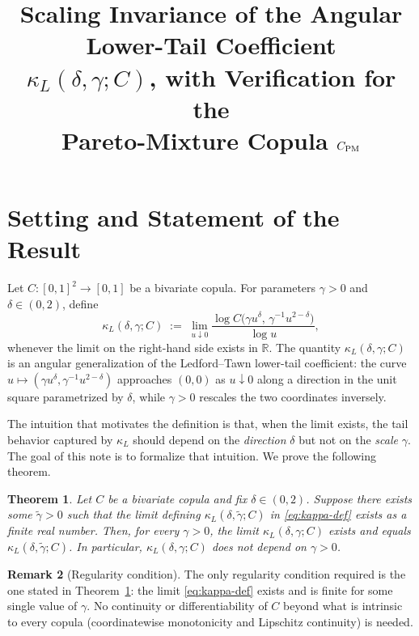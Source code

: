 \documentclass[11pt]{article}
\title{Scaling Invariance of the Angular Lower-Tail Coefficient \\
$\kappa_L(\delta,\gamma;C)$, with Verification for the \\
Pareto-Mixture Copula $C_{\mathrm{PM}}$}
\author{}
\date{}
\newtheorem{theorem}{Theorem}
\theoremstyle{definition}
\newtheorem{remark}[theorem]{Remark}
\newcommand{\R}{\mathbb{R}}
\begin{document}
\maketitle

\section{Setting and Statement of the Result}

Let $C:[0,1]^2\to[0,1]$ be a bivariate copula. For parameters
$\gamma>0$ and $\delta\in(0,2)$, define
\begin{equation}\label{eq:kappa-def}
\kappa_L(\delta,\gamma;C)
\;:=\;
\lim_{u\downarrow 0}
\frac{\log C\!\bigl(\gamma u^{\delta},\,\gamma^{-1}u^{2-\delta}\bigr)}{\log u},
\end{equation}
whenever the limit on the right-hand side exists in $\R$. The quantity
$\kappa_L(\delta,\gamma;C)$ is an angular generalization of the
Ledford--Tawn lower-tail coefficient: the curve
$u\mapsto(\gamma u^{\delta},\gamma^{-1}u^{2-\delta})$ approaches
$(0,0)$ as $u\downarrow 0$ along a direction in the unit square
parametrized by $\delta$, while $\gamma>0$ rescales the two coordinates
inversely.

The intuition that motivates the definition is that, when the limit
exists, the tail behavior captured by $\kappa_L$ should depend on the
\emph{direction} $\delta$ but not on the \emph{scale} $\gamma$. The
goal of this note is to formalize that intuition. We prove the
following theorem.

\begin{theorem}\label{thm:main}
Let $C$ be a bivariate copula and fix $\delta\in(0,2)$. Suppose there
exists some $\tilde\gamma>0$ such that the limit defining
$\kappa_L(\delta,\tilde\gamma;C)$ in \eqref{eq:kappa-def} exists as a
finite real number. Then, for every $\gamma>0$, the limit
$\kappa_L(\delta,\gamma;C)$ exists and equals
$\kappa_L(\delta,\tilde\gamma;C)$. In particular,
$\kappa_L(\delta,\gamma;C)$ does not depend on $\gamma>0$.
\end{theorem}

\begin{remark}[Regularity condition]\label{rem:reg}
The only regularity condition required is the one stated in
Theorem~\ref{thm:main}: the limit \eqref{eq:kappa-def} exists and is
finite for some single value of $\gamma$. No continuity or
differentiability of $C$ beyond what is intrinsic to every copula
(coordinatewise monotonicity and Lipschitz continuity) is needed.
\end{remark}
\end{document}
